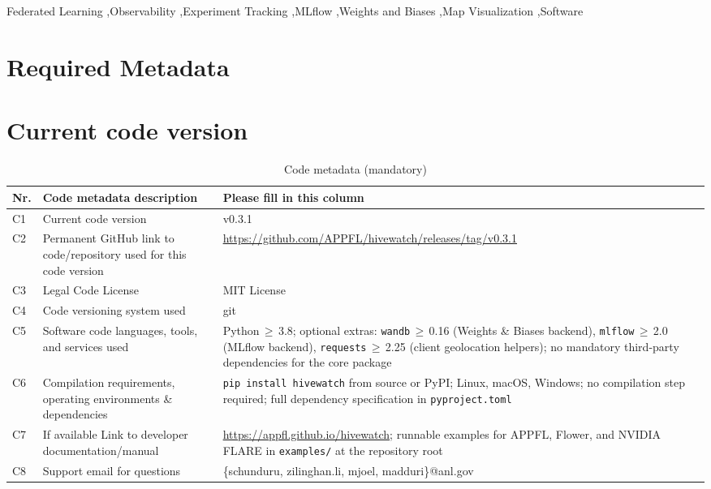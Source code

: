 \documentclass[preprint,12pt, a4paper]{elsarticle}
\newcommand{\rev}[1]{{\color{blue}#1}}
\newcommand{\rev}[1]{#1}
\begin{document}
\begin{frontmatter}
\begin{keyword}
Federated Learning \sep Observability \sep Experiment Tracking \sep MLflow \sep Weights and Biases \sep Map Visualization \sep Software



\end{keyword}

\end{frontmatter}


\section*{Required Metadata}
\label{}
\section*{Current code version}
\label{}
\begin{table}[H]
\begin{tabular}{|l|p{4.5cm}|p{7.5cm}|}
\hline
\textbf{Nr.} & \textbf{Code metadata description} & \textbf{Please fill in this column} \\
\hline
C1 & Current code version & \rev{v0.3.1}\\
\hline
C2 & Permanent GitHub link to code/repository used for this code version & \rev{\url{https://github.com/APPFL/hivewatch/releases/tag/v0.3.1}}\\
\hline
C3 & Legal Code License   & MIT License \\
\hline
C4 & Code versioning system used & git \\
\hline
C5 & Software code languages, tools, and services used & Python\,$\geq$\,3.8; optional extras: \texttt{wandb}\,$\geq$\,0.16 (Weights \& Biases backend), \texttt{mlflow}\,$\geq$\,2.0 (MLflow backend), \texttt{requests}\,$\geq$\,2.25 (client geolocation helpers); no mandatory third-party dependencies for the core package \\
\hline
C6 & Compilation requirements, operating environments \& dependencies & \texttt{pip install hivewatch} from source or PyPI; Linux, macOS, Windows; no compilation step required; full dependency specification in \texttt{pyproject.toml} \\
\hline
C7 & If available Link to developer documentation/manual & \url{https://appfl.github.io/hivewatch}; runnable examples for APPFL, Flower, and NVIDIA FLARE in \texttt{examples/} at the repository root \\
\hline
C8 & Support email for questions & \{schunduru, zilinghan.li, mjoel, madduri\}@anl.gov \\
\hline
\end{tabular}
\caption{Code metadata (mandatory)}
\label{tab:codemeta}
\end{table}
\end{document}
